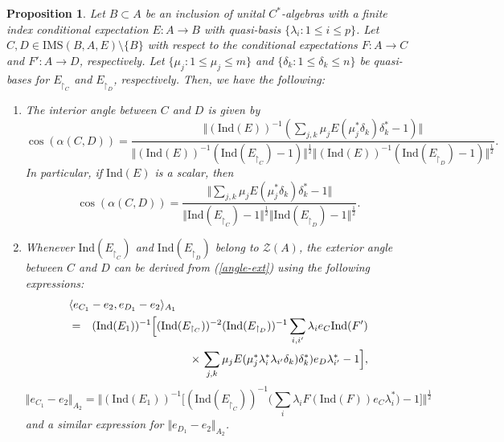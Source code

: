 \documentclass[a4]{amsart}
\newtheorem{proposition}[theorem]{\bf Proposition}
\numberwithin{equation}{section}
\newcommand{\mcal}{\mathcal}
\begin{document}
\begin{proposition} \label{Int_QB}
 Let $B\subset A$ be an inclusion of unital $C^*$-algebras with a
 finite index conditional expectation $E:A\to B$ with quasi-basis $\{\lambda_i: 1 \leq i \leq p\}$. Let $C, D\in
 \mathrm{IMS} (B,A,E)\setminus\{B\}$ with respect to the conditional
 expectations $F:A \to C$ and $F':A \to D$, respectively. Let $\{ \mu_{j} : 1\leq
 \mu_{j} \leq m\}$ and $\{ \delta_{k}: 1\leq \delta_{k} \leq n\}$ be
 quasi-bases for $E_{\restriction_{C}}$ and $E_{\restriction_{D}}$,
 respectively. Then, we have the following:
 \begin{enumerate} 
 	\item The interior angle between $C$ and $D$ is given by
 	 \begin{equation}\label{int-expn}
 	 \cos(\alpha(C,D)) = \frac{\Vert (\mathrm{Ind}(E))^{-1} \left(
           \sum_{j,k} \mu_{j} E(\mu_{j}^* \delta_{k})\delta_{k}^* -
           1\right) \Vert}{\Vert
           (\mathrm{Ind}(E))^{-1}(\mathrm{Ind}(E_{\restriction_{C}})
             - 1) \Vert^{\frac{1}{2}} \Vert
             (\mathrm{Ind}(E))^{-1}(\mathrm{Ind}(E_{\restriction_{D}})
             - 1) \Vert^{\frac{1}{2}}}.
 \end{equation}
         In particular, if $\mathrm{Ind}(E)$ is a scalar, then 
\begin{equation}\label{int-expn-scalar}
	\cos (\alpha(C,D)) = \frac{\Vert \sum_{j,k} \mu_{j}
          E(\mu_{j}^* \delta_{k})\delta_{k}^* - 1\Vert} { \Vert
          {\mathrm{Ind}(E_{\restriction_{C}}) - 1} \Vert^{\frac{1}{2}} \Vert
          {\mathrm{Ind}(E_{\restriction_{D}}) - 1} \Vert^{\frac{1}{2}}}.
\end{equation}
\item Whenever $ \mathrm{Ind}(E_{\restriction_{C}})$ and
  $\mathrm{Ind}(E_{\restriction_{D}})$ belong to $\mcal Z(A)$, the
  exterior angle between $C$ and $D$ can be derived from
  (\ref{angle-ext}) using the following expressions:
    \begin{eqnarray*}\label{ext-expn}
    \lefteqn{\langle e_{C_{1}} - e_2 , e_{D_{1}}- e_2 \rangle_{A_{1}}}\\&  = &
 (\mathrm{Ind}(E_{1}))^{-1}
\Big[(\mathrm{Ind}(E_{\restriction_{C}}))^{-2}
  (\mathrm{Ind}(E_{\restriction_{D}}))^{-1} \sum_{i,i'} \lambda_i e_C
  \mathrm{Ind}(F')\\ & & \quad \times\, \sum_{j,k} \mu_{j} E(\mu_{j}^* \lambda_{i}^*
  \lambda_{i'} \delta_{k}) \delta_{k}^*) e_D \lambda_{i'}^* - 1
  \Big],
  \end{eqnarray*}
  \[
  \Vert e_{C_{1}} - e_2 \Vert_{A_2} = \Big\Vert
    (\mathrm{Ind}(E_{1}))^{-1} \Big[
    (\mathrm{Ind}(E_{\restriction_{C}}))^{-1} \big( \sum_{i}
    \lambda_{i} F(\mathrm{Ind}(F))e_C \lambda_{i}^*\big) - 1\Big]\Big\Vert^{\frac{1}{2}}
  \]
and a similar expression for  $\Vert e_{D_{1}} - e_2 \Vert_{A_2}$.
\end{enumerate}
\end{proposition}   
\end{document}
